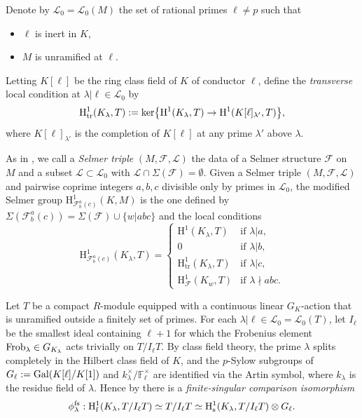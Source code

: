 \documentclass[10pt]{amsart}
\numberwithin{equation}{section}
\theoremstyle{definition}
\theoremstyle{remark}
\newcommand{\cL}{\mathscr{L}}
\newcommand{\Fcal}{\mathcal{F}}
\newcommand{\rH}{\mathrm{H}}
\DeclareMathOperator{\tr}{tr}
\begin{document}
Denote by $\cL_0=\cL_0(M)$ the set of rational primes $\ell\neq p$ such that
\begin{itemize}
\item $\ell$ is inert in $K$,
\item $M$ is unramified at $\ell$.
\end{itemize}
Letting $K[\ell]$ be the ring class field of $K$ of conductor $\ell$, define the \emph{transverse} local condition at $\lambda\vert\ell\in\cL_0$ by
\[
\rH^1_{\rm tr}(K_\lambda,T):={\rm ker}\bigl\{\rH^1(K_\lambda,T)\rightarrow\rH^1(K[\ell]_{\lambda'},T)\bigr\},
\]
where $K[\ell]_{\lambda'}$ is the completion of $K[\ell]$ at any prime $\lambda'$ above $\lambda$.

As in \cite{howard}, we call a \emph{Selmer triple} $(M,\mathcal{F},\cL)$ the data of a Selmer structure $\mathcal{F}$ on $M$ and a subset $\cL\subset\cL_0$ with $\cL\cap\Sigma(\mathcal{F})=\emptyset$. Given a Selmer triple $(M,\Fcal,\cL)$ and pairwise
coprime integers $a,b,c$ divisible only by primes in $\cL_0$, the modified Selmer group $\rH^1_{\Fcal^a_b(c)}(K,M)$ is the one defined by 
$\Sigma(\Fcal^a_b(c))=\Sigma(\Fcal)\cup\{w\vert abc\}$
and the local conditions 
\[
\rH^1_{\Fcal^a_b(c)}(K_\lambda,T)
=\begin{cases}
\rH^1(K_\lambda,T) &\text{if }\lambda\vert a,\\
0 &\text{if }\lambda\vert b,\\
\rH^1_{\tr}(K_\lambda,T) &\text{if }\lambda\vert c, \\
\rH^1_{\Fcal}(K_w,T) & \text{if }\lambda\nmid abc.
\end{cases}
\]

Let $T$ be a compact $R$-module equipped with a continuous linear $G_K$-action 
that is unramified outside a finitely set of primes.
For each $\lambda\vert\ell\in\cL_0 = \cL_0(T)$, let $I_\ell$ be the smallest ideal containing $\ell+1$ for which the Frobenius element ${\rm Frob}_\lambda\in G_{K_\lambda}$ acts trivially on $T/I_\ell T$. By class field theory, the prime $\lambda$ splits completely in the Hilbert class field of $K$, and the $p$-Sylow subgroups of $G_\ell:={\rm Gal}(K[\ell]/K[1])$ and $k_\lambda^\times/\mathbb{F}_\ell^\times$ are identified via the Artin symbol, where $k_\lambda$ is the residue field of $\lambda$. Hence by \cite[Lem.~1.2.1]{mazrub} there is a \emph{finite-singular comparison isomorphism}
\begin{equation}\label{eq:f-s}
\phi_\lambda^{\rm fs}:\rH^1_{\rm f}(K_\lambda,T/I_\ell T)\simeq T/I_\ell T\simeq\rH^1_{\rm s}(K_\lambda,T/I_\ell T)\otimes G_\ell.
\end{equation}
\end{document}
